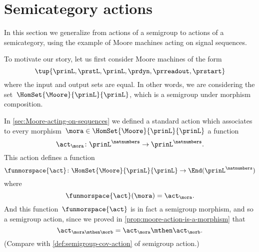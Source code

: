 
\section{Semicategory actions}
\label{sec:action-of-a-category}



In this section we generalize from actions of a semigroup to actions of a semicategory, using the example of Moore machines acting on signal sequences.

To motivate our story, let us first consider Moore machines of the form
\begin{equation}
    \tup{\prinL,\prstL,\prinL,\prdyn,\prreadout,\prstart}
\end{equation}
where the input and output sets are equal.
In other words, we are considering the set~$\HomSet{\Moore}{\prinL}{\prinL}$, which is a semigroup under morphism composition.

In \cref{sec:Moore-acting-on-sequences} we defined a standard action which associates to every morphism~$\mora \in \HomSet{\Moore}{\prinL}{\prinL}$ a function
\begin{equation}
    \act_{\mora} \colon {\prinL}^\natnumbers \to {\prinL}^\natnumbers.
\end{equation}
This action defines a function
\begin{equation}
    \funmorspace{\act} \colon  \HomSet{\Moore}{\prinL}{\prinL} \to \End ({\prinL}^{\natnumbers})
\end{equation}
where
\begin{equation}
    \funmorspace{\act}(\mora) = \act_{\mora}.
\end{equation}
And this function~$\funmorspace{\act}$ is in fact a semigroup morphism, and so a semigroup action, since we proved in \cref{prop:moore-action-is-a-morphism} that
\begin{equation}
    \act_{\mora \mthen \morb} = \act_\mora \mthen \act_\morb.
\end{equation}
(Compare with \cref{def:semigroup-cov-action} of semigroup action.)

